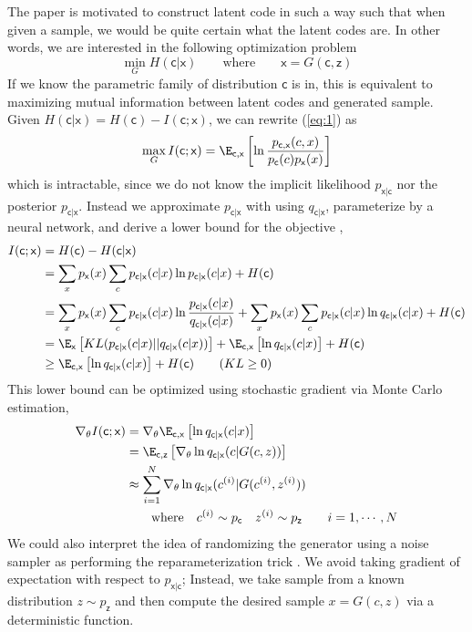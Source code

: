 \documentclass[11pt]{article}
\newcommand\rx{\ensuremath{\mathsf{x}}}
\newcommand\rc{\ensuremath{\mathsf{c}}}
\newcommand\rz{\ensuremath{\mathsf{z}}}
\begin{document}
The paper is motivated to construct latent code in such a way such that when given a sample, we would be quite certain what the latent codes are. In other words, we are interested in the following optimization problem 
\begin{equation}
    \label{eq:1}
    \min_{G} H(\rc|\rx) 
    \quad\quad \text{where}\quad\quad
    \rx = G(\rc,\rz)
\end{equation}
If we know the parametric family of distribution $\rc$ is in, this is equivalent to maximizing mutual information between latent codes and generated sample. Given $H(\rc|\rx) = H(\rc) - I(\rc;\rx)$, we can rewrite (\ref{eq:1}) as
\[
    \max_G I(\rc; \rx) 
        = \E_{\rc,\rx}\left[ \ln \frac{p_{\rc,\rx}(c,x) }{p_{\rc}(c) p_{\rx}(x)} \right]
\]
which is intractable, since we do not know the implicit likelihood $p_{\rx|\rc}$ nor the posterior $p_{\rc|\rx}$. Instead we approximate $p_{\rc|\rx}$ with using $q_{\rc|\rx}$, parameterize by a neural network, and derive a lower bound for the objective \cite{barberIMAlgorithmVariational2003,pooleVariationalBoundsMutual2019},
\begin{align*}
    I(\rc;\rx)
        &= H(\rc) - H(\rc|\rx) \\
        &= \sum_{x} p_{\rx}(x) \sum_{c} p_{\rc|\rx}(c|x) \ln p_{\rc|\rx}(c|x) + H(\rc) \\
        &= \sum_{x} p_{\rx}(x) \sum_{c} p_{\rc|\rx}(c|x) \ln \frac{p_{\rc|\rx}(c|x)}{q_{\rc|\rx}(c|x)} + \sum_{x} p_{\rx}(x) \sum_{c} p_{\rc|\rx}(c|x) \ln q_{\rc|\rx}(c|x) + H(\rc) \\
        &= \E_{\rx} \left[ KL(p_{\rc|\rx}(c|x) || q_{\rc|\rx}(c|x)) \right] + \E_{\rc,\rx} \left[ \ln q_{\rc|\rx}(c|x) \right] + H(\rc) \\
        &\geq  \E_{\rc,\rx} \left[ \ln q_{\rc|\rx}(c|x) \right] + H(\rc)  \tag{$KL \geq 0$}
\end{align*}
This lower bound can be optimized using stochastic gradient via Monte Carlo estimation,
\begin{align*}
    \nabla_{\theta} I(\rc;\rx) 
        &= \nabla_{\theta} \E_{\rc,\rx} \left[ \ln q_{\rc|\rx}(c|x) \right] \\
        &= \E_{\rc,\rz} \left[ \nabla_{\theta} \ln q_{\rc|\rx}(c|G(c,z)) \right] \\
        &\approx \sum_{i=1}^N  \nabla_{\theta} \ln q_{\rc|\rx}(c^{(i)}|G(c^{(i)},z^{(i)})) \\
        &\quad\quad\text{where} \quad c^{(i)} \sim p_{\rc} \quad z^{(i)} \sim p_{\rz} \quad\quad i=1,\cdots,N
\end{align*}
We could also interpret the idea of randomizing the generator using a noise sampler as performing the reparameterization trick \cite{kingmaAutoEncodingVariationalBayes2014}. We avoid taking gradient of expectation with respect to $p_{\rx|\rc}$; Instead, we take sample from a known distribution $z\sim p_{\rz}$ and then compute the desired sample $x = G(c,z)$ via a deterministic function.

\printbibliography 
\end{document}
